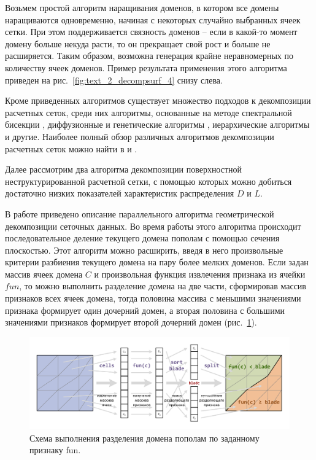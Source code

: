 Возьмем простой алгоритм наращивания доменов, в котором все домены наращиваются одновременно, начиная с некоторых случайно выбранных ячеек сетки.
При этом поддерживается связность доменов -- если в какой-то момент домену больше некуда расти, то он прекращает свой рост и больше не расширяется.
Таким образом, возможна генерация крайне неравномерных по количеству ячеек доменов.
Пример результата применения этого алгоритма приведен на рис.~\ref{fig:text_2_decompsurf_4} снизу слева.

Кроме приведенных алгоритмов существует множество подходов к декомпозиции расчетных сеток, среди них алгоритмы, основанные на методе спектральной бисекции \cite{Urschel2014Decomp}, диффузионные и генетические алгоритмы \cite{Zhao2019Decomp}, иерархические алгоритмы \cite{Kapyris1998Decomp} и другие.
Наиболее полный обзор различных алгоритмов декомпозиции расчетных сеток можно найти в \cite{Golovchenko2020Decomp} и \cite{Zheleznyakova2017Decomp}.

Далее рассмотрим два алгоритма декомпозиции поверхностной неструктурированной расчетной сетки, с помощью которых можно добиться достаточно низких показателей характеристик распределения $D$ и $L$.


В работе \cite{Golovchenko2020Decomp} приведено описание параллельного алгоритма геометрической декомпозиции сеточных данных.
Во время работы этого алгоритма происходит последовательное деление текущего домена пополам с помощью сечения плоскостью.
Этот алгоритм можно расширить, введя в него произвольные критерии разбиения текущего домена на пару более мелких доменов.
Если задан массив ячеек домена $C$ и произвольная функция извлечения признака из ячейки $fun$, то можно выполнить разделение домена на две части, сформировав массив признаков всех ячеек домена, тогда половина массива с меньшими значениями признака формирует один дочерний домен, а вторая половина с большими значениями признаков формирует второй дочерний домен (рис.~\ref{fig:text_2_decompsurf_split}).

\begin{figure}[ht]
\centering
\includegraphics[width=1.0\textwidth]{fig/par_split.pdf}
\singlespacing
{}\caption{Схема выполнения разделения домена пополам по заданному признаку fun.}
\label{fig:text_2_decompsurf_split}
\end{figure}

